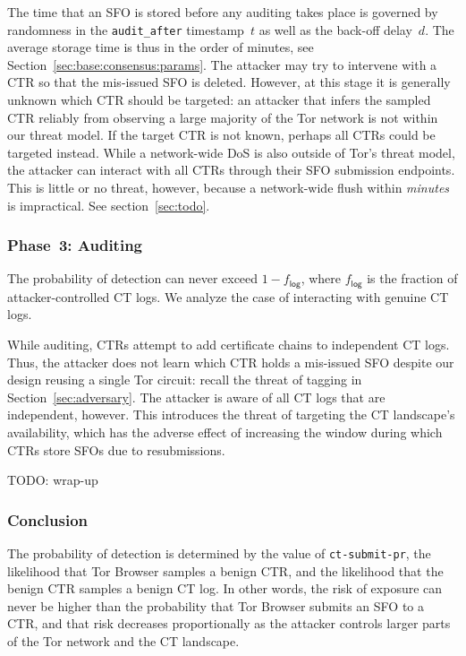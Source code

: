 The time that an SFO is stored before any auditing takes place is governed by
randomness in the \texttt{audit\_after} timestamp~$t$ as well as the back-off
delay~$d$.  The average storage time is thus in the order of minutes, see
Section~\ref{sec:base:consensus:params}.  The attacker may try to intervene with
a CTR so that the mis-issued SFO is deleted.  However, at this stage it is
generally unknown which CTR should be targeted:
	an attacker that infers the sampled CTR reliably from observing a large
	majority of the Tor network is not within our threat model.
If the target CTR is not known, perhaps all CTRs could be targeted instead.
While a network-wide DoS is also outside of Tor's threat model, the attacker can
interact with all CTRs through their SFO submission endpoints.  This is little
or no threat, however, because a network-wide flush within \emph{minutes} is
impractical.  See section~\ref{sec:todo}.

\subsubsection{Phase~3: Auditing} \label{sec:analysis:pr:phase3}
The probability of detection can never exceed $1-f_{\mathsf{log}}$, where
$f_{\mathsf{log}}$ is the fraction of attacker-controlled CT logs.  We analyze
the case of interacting with genuine CT logs.

While auditing, CTRs attempt to add certificate chains to independent CT logs.
Thus, the attacker does not learn which CTR holds a mis-issued SFO despite
our design reusing a single Tor circuit:
	recall the threat of tagging in Section~\ref{sec:adversary}.
The attacker is aware of all CT logs that are independent, however.  This
introduces the threat of targeting the CT landscape's availability, which has
the adverse effect of increasing the window during which CTRs store SFOs
due to resubmissions.

TODO: wrap-up

\subsubsection{Conclusion}
The probability of detection is determined by 
	the value of \texttt{ct-submit-pr},
	the likelihood that Tor Browser samples a benign CTR, and
	the likelihood that the benign CTR samples a benign CT log.
In other words, the risk of exposure can never be higher than the probability
that Tor Browser submits an SFO to a CTR, and that risk decreases proportionally
as the attacker controls larger parts of the Tor network and the CT landscape.
